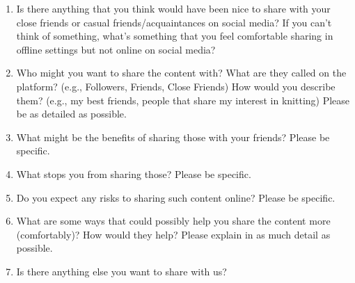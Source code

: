 \begin{enumerate}
    \item Is there anything that you think would have been nice to share with your close friends or casual friends/acquaintances on social media? If you can't think of something, what's something that you feel comfortable sharing in offline settings but not online on social media?

    \item Who might you want to share the content with? What are they called on the platform? (e.g., Followers, Friends, Close Friends) How would you describe them? (e.g., my best friends, people that share my interest in knitting) Please be as detailed as possible.

    \item What might be the benefits of sharing those with your friends? Please be specific.

    \item What stops you from sharing those? Please be specific.

    \item Do you expect any risks to sharing such content online? Please be specific.

    \item What are some ways that could possibly help you share the content more (comfortably)? How would they help? Please explain in as much detail as possible.

    \item Is there anything else you want to share with us?
\end{enumerate}